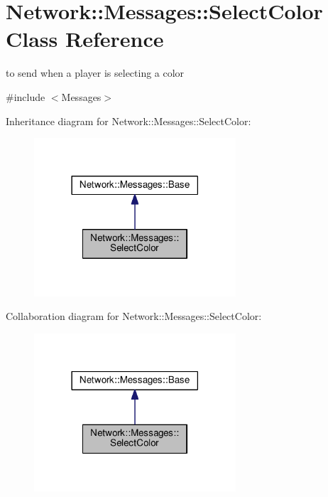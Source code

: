 \hypertarget{class_network_1_1_messages_1_1_select_color}{}\section{Network\+:\+:Messages\+:\+:Select\+Color Class Reference}
\label{class_network_1_1_messages_1_1_select_color}


to send when a player is selecting a color  




{\ttfamily \#include $<$Messages$>$}



Inheritance diagram for Network\+:\+:Messages\+:\+:Select\+Color\+:
\nopagebreak
\begin{figure}[H]
\begin{center}
\leavevmode
\includegraphics[width=213pt]{class_network_1_1_messages_1_1_select_color__inherit__graph}
\end{center}
\end{figure}


Collaboration diagram for Network\+:\+:Messages\+:\+:Select\+Color\+:
\nopagebreak
\begin{figure}[H]
\begin{center}
\leavevmode
\includegraphics[width=213pt]{class_network_1_1_messages_1_1_select_color__coll__graph}
\end{center}
\end{figure}
